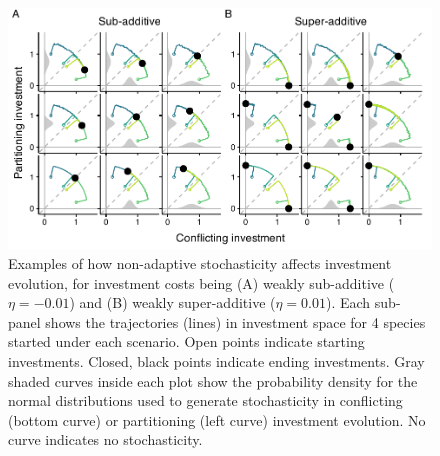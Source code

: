 \documentclass[11pt]{article}
\begin{document}
\begin{figure}[ht!]
\centering
\includegraphics{3-all_stoch.pdf}
\caption{Examples of how non-adaptive stochasticity affects investment evolution, for investment costs being (A) weakly sub-additive ($\eta = -0.01$) and (B) weakly super-additive ($\eta = 0.01$). Each sub-panel shows the trajectories (lines) in investment space for 4 species started under each scenario. Open points indicate starting investments. Closed, black points indicate ending investments. Gray shaded curves inside each plot show the probability density for the normal distributions used to generate stochasticity in conflicting (bottom curve) or partitioning (left curve) investment evolution. No curve indicates no stochasticity.}
\label{fig:stochasticity}
\end{figure}

\clearpage
\end{document}
